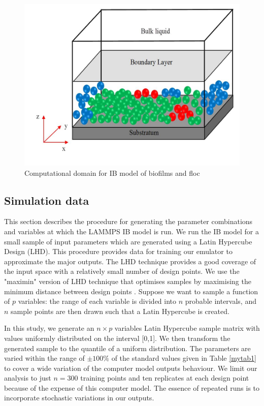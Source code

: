 \begin{figure}[!ht] 
\includegraphics[width=.8\textwidth]{result2/box}
\caption[]{Computational domain for IB model of biofilms and floc}\label{box}
\end{figure}

\subsection{Simulation data}\label{data2}
This section describes the procedure for generating the parameter combinations and variables at which the LAMMPS IB model is run. We run the IB model for a small sample of input parameters which are generated using a Latin Hypercube Design (LHD). This procedure provides data for training our emulator to approximate the major outputs. The LHD technique provides a good coverage of the input space with a relatively small number of design points. We use the "maximin" version of LHD technique that optimises samples by maximising the minimum distance between design points \citep{pd5}. Suppose we want to sample a function of $p$ variables: the range of each variable is divided into $n$ probable intervals, and $n$ sample points are then drawn such that a Latin Hypercube is created.

In this study, we generate an $n \times p$ variables Latin Hypercube sample matrix with values uniformly distributed on the interval [0,1]. We then transform the generated sample to the quantile of a uniform distribution. The parameters are varied within the range of $\pm100\%$ of the standard values given in Table \ref{mytab1} to cover a wide variation of the computer model outputs behaviour. 
We limit our analysis to just $n=300$ training points and ten replicates at each design point because of the expense of this computer model. The essence of repeated runs is to incorporate stochastic variations in our outputs. 

